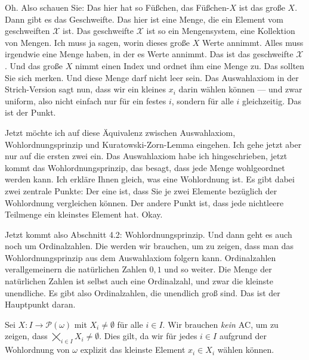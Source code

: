 \begin{spoken-clean}[00:21:00 - 00:22:30]
Oh. Also schauen Sie: Das hier hat so Füßchen, das Füßchen-$X$ ist das große $X$. Dann gibt es das Geschweifte. Das hier ist eine Menge, die ein Element vom geschweiften $\mathcal{X}$ ist. Das geschweifte $\mathcal{X}$ ist so ein Mengensystem, eine Kollektion von Mengen. Ich muss ja sagen, worin dieses große $X$ Werte annimmt. Alles muss irgendwie eine Menge haben, in der es Werte annimmt. Das ist das geschweifte $\mathcal{X}$. Und das große $X$ nimmt einen Index und ordnet ihm eine Menge zu. Das sollten Sie sich merken. Und diese Menge darf nicht leer sein. Das Auswahlaxiom in der Strich-Version sagt nun, dass wir ein kleines $x_i$ darin wählen können --- und zwar uniform, also nicht einfach nur für ein festes $i$, sondern für alle $i$ gleichzeitig. Das ist der Punkt.

Jetzt möchte ich auf diese Äquivalenz zwischen Auswahlaxiom, Wohlordnungsprinzip und Kuratowski-Zorn-Lemma eingehen. Ich gehe jetzt aber nur auf die ersten zwei ein. Das Auswahlaxiom habe ich hingeschrieben, jetzt kommt das Wohlordnungsprinzip, das besagt, dass jede Menge wohlgeordnet werden kann. Ich erkläre Ihnen gleich, was eine Wohlordnung ist. Es gibt dabei zwei zentrale Punkte: Der eine ist, dass Sie je zwei Elemente bezüglich der Wohlordnung vergleichen können. Der andere Punkt ist, dass jede nichtleere Teilmenge ein kleinstes Element hat. Okay.

Jetzt kommt also Abschnitt 4.2: Wohlordnungsprinzip. Und dann geht es auch noch um Ordinalzahlen. Die werden wir brauchen, um zu zeigen, dass man das Wohlordnungsprinzip aus dem Auswahlaxiom folgern kann. Ordinalzahlen verallgemeinern die natürlichen Zahlen $0, 1$ und so weiter. Die Menge der natürlichen Zahlen ist selbst auch eine Ordinalzahl, und zwar die kleinste unendliche. Es gibt also Ordinalzahlen, die unendlich groß sind. Das ist der Hauptpunkt daran.
\end{spoken-clean}

\begin{math-stroke}
\begin{remark}
Sei $X: I \to \mathcal{P}(\omega)$ mit $X_i \neq \emptyset$ für alle $i \in I$.
Wir brauchen \emph{kein} $\text{AC}$, um zu zeigen, dass $\bigtimes_{i \in I} X_i \neq \emptyset$.
Dies gilt, da wir für jedes $i \in I$ aufgrund der Wohlordnung von $\omega$ explizit das kleinste Element $x_i \in X_i$ wählen können.
\end{remark}
\end{math-stroke}


